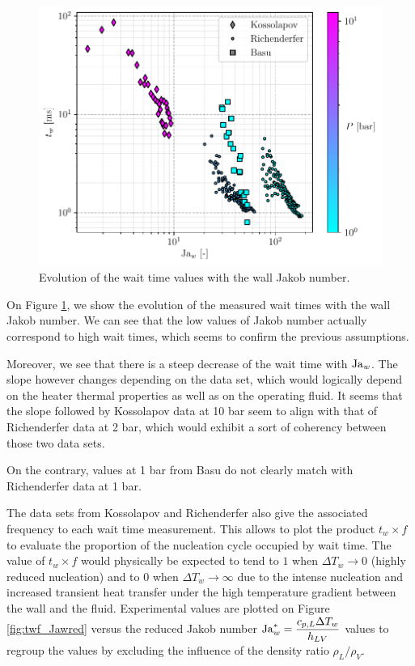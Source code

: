 \begin{figure}[!h]
\centering
\includegraphics[width=0.6\linewidth]{img/tw/Jaw_tw.pdf}
\caption{Evolution of the wait time values with the wall Jakob number.}
\label{fig:tw_Jaw}
\end{figure}

On Figure \ref{fig:tw_Jaw}, we show the evolution of the measured wait times with the wall Jakob number. We can see that the low values of Jakob number actually correspond to high wait times, which seems to confirm the previous assumptions.

\npar

Moreover, we see that there is a steep decrease of the wait time with $\mathrm{Ja}_{w}$. The slope however changes depending on the data set, which would logically depend on the heater thermal properties as well as on the operating fluid. It seems that the slope followed by Kossolapov data at 10 bar seem to align with that of Richenderfer data at 2 bar, which would exhibit a sort of coherency between those two data sets.

On the contrary, values at 1 bar from Basu do not clearly match with Richenderfer data at 1 bar.

\npar

The data sets from Kossolapov and Richenderfer also give the associated frequency to each wait time measurement. This allows to plot the product $t_{w} \times f$ to evaluate the proportion of the nucleation cycle occupied by wait time. The value of $t_{w} \times f$ would physically be expected to tend to $1$ when $\Delta T_{w} \to 0$ (highly reduced nucleation) and to $0$ when $\Delta T_{w} \to \infty$ due to the intense nucleation and increased transient heat transfer under the high temperature gradient between the wall and the fluid. Experimental values are plotted on Figure \ref{fig:twf_Jawred} versus the reduced Jakob number $\mathrm{Ja}_{w}^{*} = \dfrac{c_{p,L}\Delta T_{w}}{h_{LV}}$ values to regroup the values by excluding the influence of the density ratio $\rho_{L}/\rho_{V}$.



